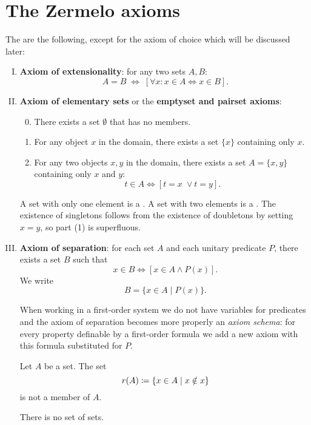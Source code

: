 \section{The Zermelo axioms}
The  are the following, except for the axiom of choice which will be discussed later:
\begin{enumerate}[(I)]
\item \textbf{Axiom of extensionality}: for any two sets $A,B$:
\[ A=B \;\iff\; \left[\forall x:x\in A\iff x\in B\right]. \]
\item \textbf{Axiom of elementary sets} or the \textbf{emptyset and pairset axioms}:
\begin{enumerate}[(1)] \setcounter{enumii}{-1}
\item There exists a set $\emptyset$ that has no members.
\item For any object $x$ in the domain, there exists a set $\{x\}$ containing only $x$.
\item For any two objects $x,y$ in the domain, there exists a set $A = \{x,y\}$ containing only $x$ and $y$:
\[ t\in A \iff [t=x\;\lor t=y]. \]
\end{enumerate}
\begin{note}
A set with only one element is a . A set with two elements is a . The existence of singletons follows from the existence of doubletons by setting $x=y$, so part (1) is superfluous.
\end{note}
\item \textbf{Axiom of separation}: for each set $A$ and each unitary predicate $P$, there exists a set $B$ such that
\[ x\in B \iff [x\in A \land P(x)]. \]
We write
\[ B = \{x\in A\;|\; P(x)\}. \]
\begin{note}
When working in a first-order system we do not have variables for predicates and the axiom of separation becomes more properly an \emph{axiom schema}: for every property definable by a first-order formula we add a new axiom with this formula substituted for $P$.
\end{note}
\begin{note}
\begin{proposition} \label{russelParadox}
Let $A$ be a set. The set
\[ r(A) \coloneqq \{ x\in A\;|\; x\notin x \} \]
is not a member of $A$.
\end{proposition}
\begin{corollary} \label{setOfSets}
There is no set of sets.
\end{corollary}
\end{note}

\end{enumerate}
